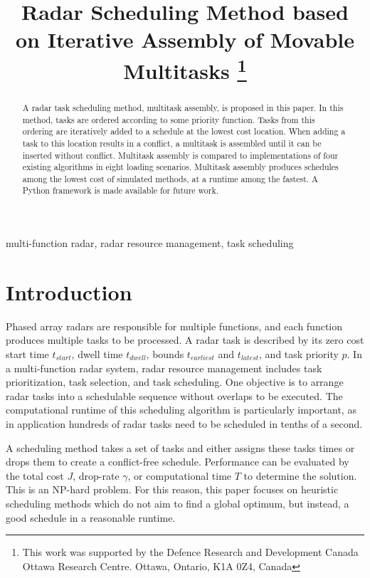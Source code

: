 \documentclass[journal,12pt,onecolumn,draftclsnofoot,]{IEEEtran}
\begin{document}
\title{Radar Scheduling Method based on Iterative Assembly of Movable Multitasks
	\thanks{This work was supported by the Defence Research and Development Canada Ottawa Research Centre. Ottawa, Ontario, K1A 0Z4, Canada}
}

\author{
}

\maketitle

\begin{abstract}
	A radar task scheduling method, multitask assembly, is proposed in this paper.
	In this method, tasks are ordered according to some priority function.
	Tasks from this ordering are iteratively added to a schedule at the lowest cost location.
	When adding a task to this location results in a conflict, a multitask is assembled until it can be inserted without conflict.
	Multitask assembly is compared to implementations of four existing algorithms in eight loading scenarios.
	Multitask assembly produces schedules among the lowest cost of simulated methods, at a runtime among the fastest.
	A Python framework is made available for future work.
\end{abstract}

\begin{IEEEkeywords}
	multi-function radar, radar resource management, task scheduling
\end{IEEEkeywords}

\section{Introduction}

Phased array radars are responsible for multiple functions, and each function produces multiple tasks to be processed.
A radar task is described by its zero cost start time $t_{start}$, dwell time $t_{dwell}$, bounds $t_{earliest}$ and $t_{latest}$, and task priority $p$.
In a multi-function radar system, radar resource management includes task prioritization, task selection, and task scheduling.
One objective is to arrange radar tasks into a schedulable sequence without overlaps to be executed.
The computational runtime of this scheduling algorithm is particularly important, as in application hundreds of radar tasks need to be scheduled in tenths of a second.

A scheduling method takes a set of tasks and either assigns these tasks times or drops them to create a conflict-free schedule.
Performance can be evaluated by the total cost $J$, drop-rate $\gamma$, or computational time $T$ to determine the solution.
This is an NP-hard problem.
For this reason, this paper focuses on heuristic scheduling methods which do not aim to find a global optimum, but instead, a good schedule in a reasonable runtime.
\end{document}
